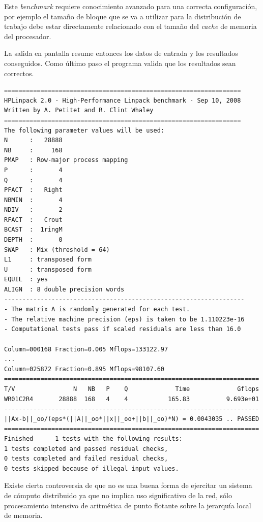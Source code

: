 \documentclass[a4paper]{report}
\begin{document}
Este {\it benchmark} requiere conocimiento avanzado para una correcta configuración, por ejemplo el tamaño de bloque que se va a utilizar para la distribución de trabajo
debe estar directamente relacionado con el tamaño del {\it cache} de memoria del procesador.

\bigskip

La salida en pantalla resume entonces los datos de entrada y los resultados conseguidos. Como último paso el programa valida que los resultados sean correctos.

{\small
\begin{verbatim}
=================================================================
HPLinpack 2.0 - High-Performance Linpack benchmark - Sep 10, 2008
Written by A. Petitet and R. Clint Whaley
=================================================================
The following parameter values will be used:
N      :   28888
NB     :     168
PMAP   : Row-major process mapping
P      :       4
Q      :       4
PFACT  :   Right
NBMIN  :       4
NDIV   :       2
RFACT  :   Crout
BCAST  :  1ringM
DEPTH  :       0
SWAP   : Mix (threshold = 64)
L1     : transposed form
U      : transposed form
EQUIL  : yes
ALIGN  : 8 double precision words
------------------------------------------------------------------
- The matrix A is randomly generated for each test.
- The relative machine precision (eps) is taken to be 1.110223e-16
- Computational tests pass if scaled residuals are less than 16.0

Column=000168 Fraction=0.005 Mflops=133122.97
...
Column=025872 Fraction=0.895 Mflops=98107.60
======================================================================
T/V                N   NB   P    Q             Time             Gflops
WR01C2R4       28888  168   4    4           165.83          9.693e+01
----------------------------------------------------------------------
||Ax-b||_oo/(eps*(||A||_oo*||x||_oo+||b||_oo)*N) = 0.0043035 .. PASSED
======================================================================
Finished      1 tests with the following results:
1 tests completed and passed residual checks,
0 tests completed and failed residual checks,
0 tests skipped because of illegal input values.
\end{verbatim}
}

\bigskip

Existe cierta controversia de que no es una buena forma de ejercitar un sistema de cómputo distribuido ya que no implica uso significativo de la
red, sólo procesamiento intensivo de aritmética de punto flotante sobre la jerarquía local de memoria.
\end{document}
